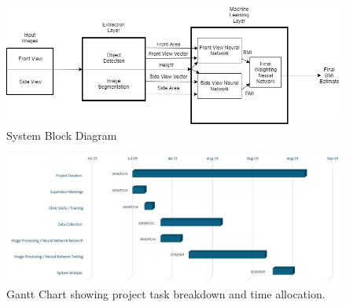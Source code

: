 \begin{landscape}
\begin{figure}
    \centering
    \includegraphics[width=\linewidth]{systemblock.jpg}
    \caption{System Block Diagram}
    \label{fig:systemblockdiagram}
\end{figure}
\end{landscape}
\begin{landscape}
\begin{figure}
    \centering
    \includegraphics[width=\linewidth]{gannt.JPG}
    \caption{Gantt Chart showing project task breakdown and time allocation.}
    \label{fig:gantt}
\end{figure}
\end{landscape}